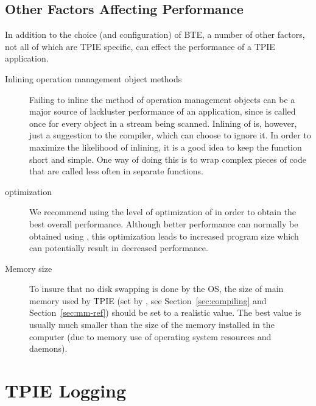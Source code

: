 \subsection{Other Factors Affecting Performance}

In addition to the choice (and configuration) of BTE, a number of other
factors, not all of which are TPIE specific, can effect the performance of
a TPIE application.

\begin{description}
    \item[Inlining operation management object methods]
    Failing to inline the  method of
    operation management objects can be a major source of
    lackluster performance of an application, since
     is called once for every object in a
    stream being scanned. Inlining of  is,
    however, just a suggestion to the compiler, which can
    choose to ignore it. In order to maximize the likelihood
    of inlining, it is a good idea to keep the function
    short and simple. One way of doing this is to wrap
    complex pieces of code that are called less often in
    separate functions.
    \item[ optimization] We recommend using the
     level of optimization of  in
    order to obtain the best overall performance. Although
    better performance can normally be obtained using
    , this optimization leads to increased
    program size which can potentially result in decreased
    performance.
    \item[Memory size] To insure that no disk swapping is
    done by the OS, the size of main memory used by TPIE
    (set by , see
    Section~\ref{sec:compiling} and Section~\ref{sec:mm-ref})
    should be set to a realistic value. The best value is
    usually much smaller than the size of the memory
    installed in the computer (due to memory use of
    operating system resources and daemons).
\end{description}



\section{TPIE Logging}

